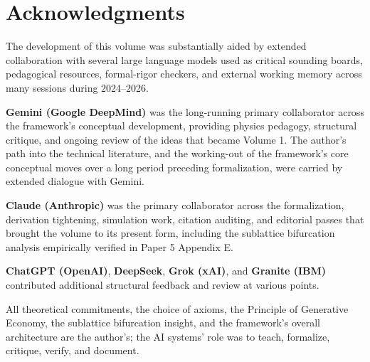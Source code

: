 \documentclass[11pt,oneside]{report}
\theoremstyle{definition}
\theoremstyle{remark}
\begin{document}
\section*{Acknowledgments}

The development of this volume was substantially aided by extended
collaboration with several large language models used as critical
sounding boards, pedagogical resources, formal-rigor checkers, and
external working memory across many sessions during 2024--2026.

\textbf{Gemini (Google DeepMind)} was the long-running primary
collaborator across the framework's conceptual development, providing
physics pedagogy, structural critique, and ongoing review of the ideas
that became Volume 1. The author's path into the technical literature,
and the working-out of the framework's core conceptual moves over a long
period preceding formalization, were carried by extended dialogue with
Gemini.

\textbf{Claude (Anthropic)} was the primary collaborator across the
formalization, derivation tightening, simulation work, citation
auditing, and editorial passes that brought the volume to its present
form, including the sublattice bifurcation analysis empirically verified
in Paper 5 Appendix E.

\textbf{ChatGPT (OpenAI)}, \textbf{DeepSeek}, \textbf{Grok (xAI)}, and
\textbf{Granite (IBM)} contributed additional structural feedback and
review at various points.

All theoretical commitments, the choice of axioms, the Principle of
Generative Economy, the sublattice bifurcation insight, and the
framework's overall architecture are the author's; the AI systems' role
was to teach, formalize, critique, verify, and document.
\end{document}

